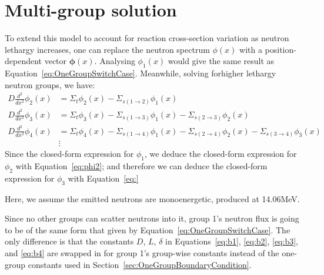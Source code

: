 \documentclass[a4paper, 12pt]{article}
\newcommand{\ve}[1]{\boldsymbol{#1}}
\begin{document}
\section{Multi-group solution}
To extend this model to account for reaction cross-section variation as neutron lethargy increases, one can replace the neutron spectrum $\phi(x)$ with a position-dependent vector $\ve{\phi}(x)$. Analysing $\phi_1(x)$ would give the same result as Equation~\ref{eq:OneGroupSwitchCase}. Meanwhile, solving forhigher lethargy neutron groups, we have:
\begin{align}
    D \frac{d^2}{dx^2}\phi_2(x) &= \Sigma_t \phi_2(x)  - \Sigma_{s(1\rightarrow 2)} \phi_1(x)\label{eq:phi2}\\
    D \frac{d^2}{dx^2}\phi_3(x) &= \Sigma_t \phi_3(x)  - \Sigma_{s(1\rightarrow 3)} \phi_1(x) - \Sigma_{s(2\rightarrow 3)} \phi_2(x)\label{eq:phi3}\\
    D \frac{d^2}{dx^2}\phi_4(x) &= \Sigma_t \phi_4(x)  - \Sigma_{s(1\rightarrow 4)} \phi_1(x) - \Sigma_{s(2\rightarrow 4)} \phi_2(x) - \Sigma_{s(3\rightarrow 4)} \phi_3(x)\label{eq:phi4}\\
    &\vdots \nonumber
\end{align}
Since the closed-form expression for $\phi_1$, we deduce the closed-form expression for $\phi_2$ with Equation~\ref{eq:phi2}; and therefore we can deduce the closed-form expression for $\phi_3$ with Equation~\ref{eq:}

Here, we assume the emitted neutrons are monoenergetic, produced at 14.06MeV.

Since no other groups can scatter neutrons into it, group 1's neutron flux is going to be of the same form that given by Equation~\ref{eq:OneGroupSwitchCase}. The only difference is that the constants $D$, $L$, $\delta$ in Equations~\ref{eq:b1}, \ref{eq:b2}, \ref{eq:b3}, and \ref{eq:b4} are swapped in for group 1's group-wise constants instead of the one-group constants used in Section~\ref{sec:OneGroupBoundaryCondition}.



\end{document}
